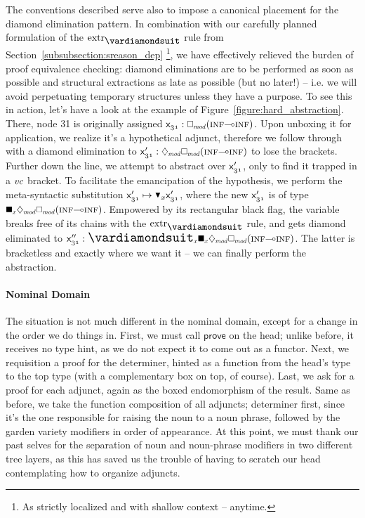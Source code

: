The conventions described serve also to impose a canonical placement for the diamond elimination pattern.
In combination with our carefully planned formulation of the $\Extraction$ rule from Section~\ref{subsubsection:sreason_dep}%
	\footnote{As strictly localized and with shallow context -- anytime.},
we have effectively relieved the burden of proof equivalence checking: diamond eliminations are to be performed as soon as possible and structural extractions as late as possible (but no later!) -- i.e. we will avoid perpetuating temporary structures unless they have a purpose.
To see this in action, let's have a look at the example of Figure~\ref{figure:hard_abstraction}.
There, node 31 is originally assigned $\Var{31} : \dbox{mod}(\infp[s]\li\infp[s])$.
Upon unboxing it for application, we realize it's a hypothetical adjunct, therefore we follow through with a diamond elimination to $\Var{31}' : \ddia{mod}\dbox{mod}(\infp[s]\li\infp[s])$ to lose the  brackets.
Further down the line, we attempt to abstract over $\mathsf{x}_{\mathnormal{31}}'$, only to find it trapped in a $\mathnormal{vc}$ bracket.
To facilitate the emancipation of the hypothesis, we perform the meta-syntactic substitution $\Var{31}' \mapsto \dboxelim{x}\Var{31}'$, where the new $\mathsf{x}_{\mathnormal{31}}'$ is of type $\dxbox{x}\ddia{mod}\dbox{mod}(\infp[s]\li\infp[s])$.
Empowered by its rectangular black flag, the variable breaks free of its chains with the $\Extraction$ rule, and gets diamond eliminated to $\Var{31}'' : \dxdia{x}\dxbox{x}\ddia{mod}\dbox{mod}(\infp[s]\li\infp[s])$.
The latter is bracketless and exactly where we want it -- we can finally perform the abstraction.

\paragraph{Nominal Domain}
The situation is not much different in the nominal domain, except for a change in the order we do things in.
First, we must call $\mathsf{prove}$ on the head; unlike before, it receives no type hint, as we do not expect it to come out as a functor.
Next, we requisition a proof for the determiner, hinted as a function from the head's type to the top type (with a complementary box on top, of course).
Last, we ask for a proof for each adjunct, again as the boxed endomorphism of the result.
Same as before, we take the function composition of all adjuncts; determiner first, since it's the one responsible for raising the noun to a noun phrase, followed by the garden variety modifiers in order of appearance.
At this point, we must thank our past selves for the separation of noun and noun-phrase modifiers in two different tree layers, as this has saved us the trouble of having to scratch our head contemplating how to organize adjuncts.

